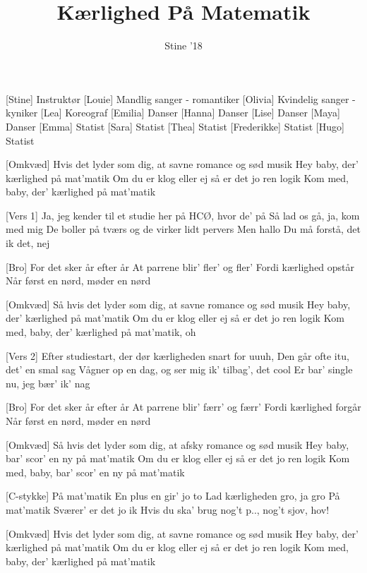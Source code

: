 \documentclass[a4paper,11pt]{article}
\title{Kærlighed På Matematik}
\author{Stine '18}
\begin{document}
\maketitle

\begin{roles}
[Stine] Instruktør
[Louie] Mandlig sanger - romantiker
[Olivia] Kvindelig sanger - kyniker
[Lea] Koreograf
[Emilia] Danser
[Hanna] Danser
[Lise] Danser
[Maya] Danser
[Emma] Statist
[Sara] Statist
[Thea] Statist
[Frederikke] Statist
[Hugo] Statist
\end{roles}

\begin{song}
[Omkvæd] Hvis det lyder som dig, at savne romance og sød musik
Hey baby, der’ kærlighed på mat’matik
Om du er klog eller ej så er det jo ren logik
Kom med, baby, der’ kærlighed på mat’matik

[Vers 1] Ja, jeg kender til et studie her på HCØ, 
hvor de’ på
Så lad os gå, ja, kom med mig
De boller på tværs og de virker lidt pervers
Men hallo
Du må forstå, det ik det, nej

[Bro] For det sker år efter år
At parrene blir’ fler’ og fler’ 
Fordi kærlighed opstår 
Når først en nørd, møder en nørd

[Omkvæd] Så hvis det lyder som dig, at savne romance og sød musik
Hey baby, der’ kærlighed på mat’matik
Om du er klog eller ej så er det jo ren logik
Kom med, baby, der’ kærlighed på mat’matik, oh


[Vers 2] Efter studiestart, der dør kærligheden snart for uuuh, 
Den går ofte itu, det' en smal sag
Vågner op en dag, og ser mig ik' tilbag', det cool
Er bar' single nu, jeg bær' ik' nag

[Bro] For det sker år efter år
At parrene blir’ færr’ og færr’ 
Fordi kærlighed forgår 
Når først en nørd, møder en nørd

[Omkvæd] Så hvis det lyder som dig, at afsky romance og sød musik
Hey baby, bar' scor' en ny på mat’matik
Om du er klog eller ej så er det jo ren logik
Kom med, baby, bar' scor' en ny på mat’matik

[C-stykke] På mat’matik
En plus en gir’ jo to
Lad kærligheden gro, ja gro
 På mat’matik
Sværer' er det jo ik
Hvis du ska' brug nog't p.., nog't sjov, hov!


[Omkvæd] Hvis det lyder som dig, at savne romance og sød musik
Hey baby, der’ kærlighed på mat’matik
Om du er klog eller ej så er det jo ren logik
Kom med, baby, der’ kærlighed på mat’matik
\end{song}
\end{document}
